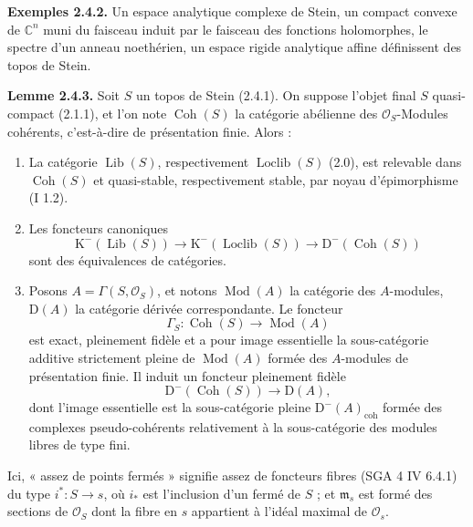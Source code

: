 \documentclass[11pt]{article}
\providecommand{\Mod}{\operatorname{Mod}}
\providecommand{\Lib}{\operatorname{Lib}}
\providecommand{\Loclib}{\operatorname{Loclib}}
\providecommand{\Coh}{\operatorname{Coh}}
\providecommand{\coh}{\operatorname{coh}}
\begin{document}
\textbf{Exemples 2.4.2.} Un espace analytique complexe de Stein, un compact convexe de $\mathbb C^n$ muni du faisceau induit par le faisceau des fonctions holomorphes, le spectre d'un anneau noethérien, un espace rigide analytique affine définissent des topos de Stein.

\textbf{Lemme 2.4.3.} Soit $S$ un topos de Stein (2.4.1). On suppose l'objet final $S$ quasi-compact (2.1.1), et l'on note $\Coh(S)$ la catégorie abélienne des $\mathcal O_S$-Modules cohérents, c'est-à-dire de présentation finie. Alors :
\begin{enumerate}[label=\alph*)]
\item La catégorie $\Lib(S)$, respectivement $\Loclib(S)$ (2.0), est relevable dans $\Coh(S)$ et quasi-stable, respectivement stable, par noyau d'épimorphisme (I 1.2).
\item Les foncteurs canoniques
\[
\mathrm K^{-}(\Lib(S))\longrightarrow\mathrm K^{-}(\Loclib(S))\longrightarrow\mathrm D^{-}(\Coh(S))
\]
sont des équivalences de catégories.
\item Posons $A=\Gamma(S,\mathcal O_S)$, et notons $\Mod(A)$ la catégorie des $A$-modules, $\mathrm D(A)$ la catégorie dérivée correspondante. Le foncteur
\[
\Gamma_S:\Coh(S)\longrightarrow\Mod(A)
\]
est exact, pleinement fidèle et a pour image essentielle la sous-catégorie additive strictement pleine de $\Mod(A)$ formée des $A$-modules de présentation finie. Il induit un foncteur pleinement fidèle
\[
\mathrm D^{-}(\Coh(S))\longrightarrow\mathrm D(A),
\]
dont l'image essentielle est la sous-catégorie pleine $\mathrm D^{-}(A)_{\coh}$ formée des complexes pseudo-cohérents relativement à la sous-catégorie des modules libres de type fini.
\end{enumerate}
Ici, « assez de points fermés » signifie assez de foncteurs fibres (SGA 4 IV 6.4.1) du type $i^*:S\to s$, où $i_*$ est l'inclusion d'un fermé de $S$ ; et $\mathfrak m_s$ est formé des sections de $\mathcal O_S$ dont la fibre en $s$ appartient à l'idéal maximal de $\mathcal O_s$.
\end{document}

